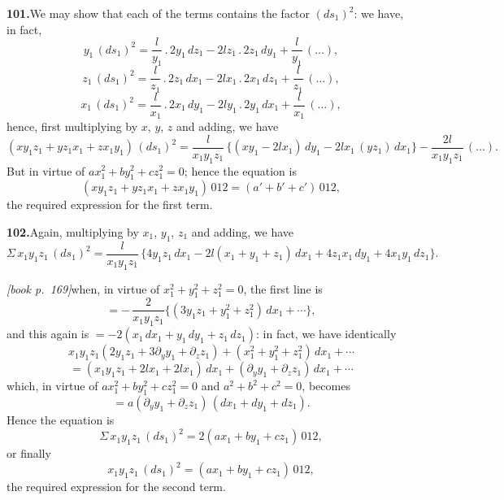 \documentclass[11pt,a4paper]{article}
\begin{document}
\medskip\noindent\textbf{101.}\quad We may show that each of the terms contains the factor $(ds_1)^2$: we have, in fact,
\[
y_1\,(ds_1)^2 = \frac{l}{y_1}\,.\,2y_1\,dz_1 - 2lz_1\,.\,2z_1\,dy_1 + \frac{l}{y_1}\,(\ldots),
\]
\[
z_1\,(ds_1)^2 = \frac{l}{z_1}\,.\,2z_1\,dx_1 - 2lx_1\,.\,2x_1\,dz_1 + \frac{l}{z_1}\,(\ldots),
\]
\[
x_1\,(ds_1)^2 = \frac{l}{x_1}\,.\,2x_1\,dy_1 - 2ly_1\,.\,2y_1\,dx_1 + \frac{l}{x_1}\,(\ldots),
\]
hence, first multiplying by $x$, $y$, $z$ and adding, we have
\[
(xy_1z_1 + yz_1x_1 + zx_1y_1)\,(ds_1)^2 = \frac{l}{x_1y_1z_1}\,\bigl\{(xy_1 - 2lx_1)\,dy_1 - 2lx_1\,(yz_1)\,dx_1\bigr\} - \frac{2l}{x_1y_1z_1}\,(\ldots).
\]
But in virtue of $a x_1^2 + b y_1^2 + c z_1^2 = 0$; hence the equation is
\[
(xy_1z_1 + yz_1x_1 + zx_1y_1)\,012 = (a' + b' + c')\,012,
\]
the required expression for the first term.

\medskip\noindent\textbf{102.}\quad Again, multiplying by $x_1$, $y_1$, $z_1$ and adding, we have
\[
\Sigma\,x_1y_1z_1\,(ds_1)^2 = \frac{l}{x_1y_1z_1}\,\bigl\{4y_1z_1\,dx_1 - 2l(x_1 + y_1 + z_1)\,dx_1 + 4z_1x_1\,dy_1 + 4x_1y_1\,dz_1\bigr\}.
\]

\medskip\noindent\textit{[book p.~169]}\quad when, in virtue of $x_1^2 + y_1^2 + z_1^2 = 0$, the first line is
\[
= -\,\frac{2}{x_1y_1z_1}\bigl\{(3y_1z_1 + y_1^2 + z_1^2)\,dx_1 + \cdots\bigr\},
\]
and this again is $= -2(x_1\,dx_1 + y_1\,dy_1 + z_1\,dz_1)$: in fact, we have identically
\[
x_1y_1z_1(2y_1z_1 + 3\partial_y y_1 + \partial_z z_1) + (x_1^2 + y_1^2 + z_1^2)\,dx_1 + \cdots
\]
\[
= (x_1y_1z_1 + 2lx_1 + 2lx_1)\,dx_1 + (\partial_y y_1 + \partial_z z_1)\,dx_1 + \cdots
\]
which, in virtue of $a x_1^2 + b y_1^2 + c z_1^2 = 0$ and $a^2 + b^2 + c^2 = 0$, becomes
\[
= a(\partial_y y_1 + \partial_z z_1)\,(dx_1 + dy_1 + dz_1).
\]
Hence the equation is
\[
\Sigma\,x_1y_1z_1\,(ds_1)^2 = 2(ax_1 + by_1 + cz_1)\,012,
\]
or finally
\[
x_1y_1z_1\,(ds_1)^2 = (ax_1 + by_1 + cz_1)\,012,
\]
the required expression for the second term.
\end{document}
